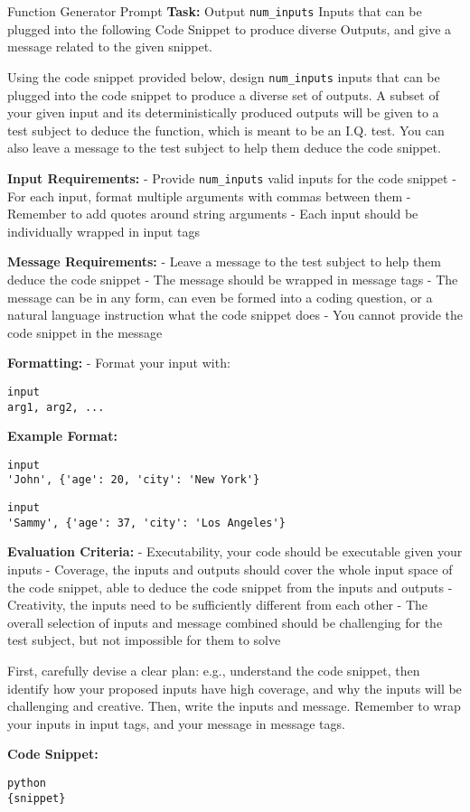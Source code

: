\documentclass[10pt,a4paper]{article}
\begin{document}
\begin{promptbox}{Function Generator Prompt}
\footnotesize
\textbf{Task:} Output \texttt{num\_inputs} Inputs that can be plugged into the following Code Snippet to produce diverse Outputs, and give a message related to the given snippet.

Using the code snippet provided below, design \texttt{num\_inputs} inputs that can be plugged into the code snippet to produce a diverse set of outputs. A subset of your given input and its deterministically produced outputs will be given to a test subject to deduce the function, which is meant to be an I.Q. test. You can also leave a message to the test subject to help them deduce the code snippet.

\textbf{Input Requirements:}
- Provide \texttt{num\_inputs} valid inputs for the code snippet
- For each input, format multiple arguments with commas between them
- Remember to add quotes around string arguments
- Each input should be individually wrapped in input tags

\textbf{Message Requirements:}
- Leave a message to the test subject to help them deduce the code snippet
- The message should be wrapped in message tags
- The message can be in any form, can even be formed into a coding question, or a natural language instruction what the code snippet does
- You cannot provide the code snippet in the message

\textbf{Formatting:}
- Format your input with:
\begin{verbatim}input
arg1, arg2, ...
\end{verbatim}

\textbf{Example Format:}
\begin{verbatim}input
'John', {'age': 20, 'city': 'New York'}
\end{verbatim}
\begin{verbatim}input
'Sammy', {'age': 37, 'city': 'Los Angeles'}
\end{verbatim}

\textbf{Evaluation Criteria:}
- Executability, your code should be executable given your inputs
- Coverage, the inputs and outputs should cover the whole input space of the code snippet, able to deduce the code snippet from the inputs and outputs
- Creativity, the inputs need to be sufficiently different from each other
- The overall selection of inputs and message combined should be challenging for the test subject, but not impossible for them to solve

First, carefully devise a clear plan: e.g., understand the code snippet, then identify how your proposed inputs have high coverage, and why the inputs will be challenging and creative. Then, write the inputs and message. Remember to wrap your inputs in input tags, and your message in message tags.

\textbf{Code Snippet:}
\begin{verbatim}python
{snippet}
\end{verbatim}
\end{promptbox}
\end{document}
